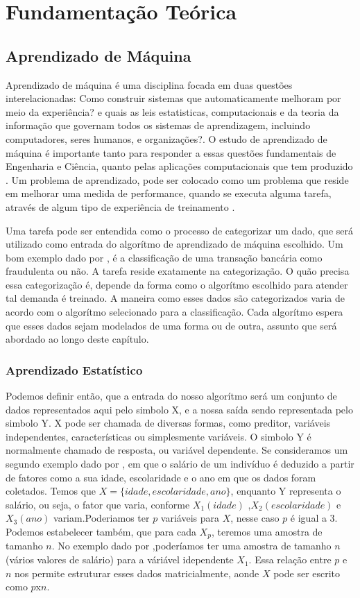\chapter{Fundamentação Teórica}

\section{Aprendizado de Máquina}
Aprendizado de máquina é uma disciplina focada em duas questões interelacionadas: Como construir sistemas que automaticamente melhoram por meio da experiência? e quais as leis estatisticas,
computacionais e da teoria da informação que governam todos os sistemas de aprendizagem, incluindo computadores, seres humanos, e organizações?. O estudo de aprendizado de máquina é importante tanto
para responder a essas questões fundamentais de Engenharia e Ciência, quanto pelas aplicações computacionais que tem produzido \cite{Jordan}.
Um problema de aprendizado, pode ser colocado como um problema que reside em melhorar uma medida de performance, quando se executa alguma tarefa, através de algum tipo de experiência de treinamento \cite{Jordan}.

Uma tarefa pode ser entendida como o processo de categorizar um dado, que será utilizado como entrada do algorítmo de aprendizado de máquina escolhido. Um bom exemplo dado por \cite{Jordan}, é a classificação de uma
transação bancária como fraudulenta ou não. A tarefa reside exatamente na categorização. O quão precisa essa categorização é, depende da forma como o algorítmo escolhido para atender tal demanda é treinado. A maneira como
esses dados são categorizados varia de acordo com o algorítmo selecionado para a classificação. Cada algorítmo espera que esses dados sejam modelados de uma forma ou de outra, assunto que será abordado ao longo deste capítulo.

\subsection{Aprendizado Estatístico}
Podemos definir então, que a entrada do nosso algorítmo será um conjunto de dados representados aqui pelo simbolo X, e a nossa saída sendo representada pelo simbolo Y.
X pode ser chamada de diversas formas, como preditor, variáveis independentes, características ou simplesmente variáveis.
O simbolo Y é normalmente chamado de resposta, ou variável dependente. Se consideramos um segundo exemplo dado por \cite{James}, em que o salário de um indivíduo é deduzido a partir
de fatores como a sua idade, escolaridade e o ano em que os dados foram coletados. Temos que $X = \{idade, escolaridade, ano\}$, enquanto Y representa o salário, ou seja, o fator que varia,
conforme $X_1(idade)$  ,$X_2(escolaridade)$ e $X_3(ano)$ variam.Poderiamos ter $p$ variáveis para $X$, nesse caso $p$ é igual a 3.
Podemos estabelecer também, que para cada $X_p$, teremos uma amostra de tamanho $n$. No exemplo dado por \cite{James},poderíamos ter uma amostra de tamanho $n$(vários valores de salário) para a váriável idependente $X_1$. Essa relação entre $p$ e $n$ nos permite estruturar esses dados matricialmente, aonde $X$ pode ser escrito como $p$x$n$\cite{James}.

